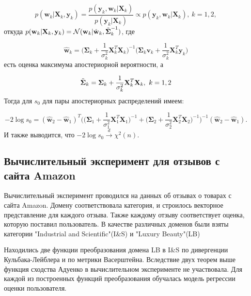 \documentclass[12pt]{extarticle}
\newcommand{\bfw}{\mathbf{w}}
\newcommand{\bfv}{\mathbf{v}}
\newcommand{\bfX}{\mathbf{X}}
\newcommand{\bfy}{\mathbf{y}}
\newcommand{\bsigma}{\boldsymbol\Sigma}
\begin{document}
$$p(\bfw_k|\bfX_k, \bfy_k) = \frac{p(\bfy_k, \bfw_k|\bfX_k)}{p(\bfy_k|\bfX_k)} \propto p(\bfy_k, \bfw_k|\bfX_k), \ k = 1, 2,$$
откуда $p(\bfw_k|\bfX_k, \bfy_k) = \mathcal{N} (\bfw_k|\hat{\bfw}_k, \Tilde{\bsigma}^{-1}_k)$, где

$$\hat{\bfw}_k = \Big( \bsigma_k + \frac{1}{\sigma^2_k} \bfX^T_k\bfX_k\Big)^{-1} \Big( \bsigma_k\bfv_k + \frac{1}{\sigma^2_k}\bfX^T_k\bfy_k\Big)$$
есть оценка максимума апостериорной вероятности, а

$$\Tilde{\bsigma}_k = \bsigma_k + \frac{1}{\sigma^2_k}\bfX^T_k\bfX_k, \ k = 1, 2$$
Тогда для $s_0$ для пары апостериорных распределений имеем:

$$- 2 \log s_0 = (\hat{\bfw}_2 - \hat{\bfw}_1)^T \Bigg( \Big( \bsigma_1 + \frac{1}{\sigma^2_1}\bfX^T_1\bfX_1 \Big)^{-1} + \Big( \bsigma_2 + \frac{1}{\sigma^2_2}\bfX^T_2\bfX_2 \Big)^{-1} \Bigg)^{-1} (\hat{\bfw}_2 - \hat{\bfw}_1).$$
И также выводится, что $-2 \log s_0 \xrightarrow{d} \chi^2(n)$.

\newpage
\subsection{Вычислительный эксперимент для отзывов с сайта Amazon}

Вычислительный эксперимент проводился на данных об отзывах о товарах с сайта Amazon. Домену соответствовала категория, и строилось векторное представление для каждого отзыва. Также каждому отзыву соответствует оценка, которую поставил пользователь. В качестве различных доменов были взяты категории "Industrial and Scientific"(I\&S) и "Luxury Beauty"(LB)

Находились две функции преобразования домена LB в I\&S по дивергенции Кульбака-Лейблера и по метрики Васерштейна. Вследствие двух теорем выше функция сходства Адуенко в вычислительном эксперименте не участвовала. Для каждой из построенных функций преобразования обучалась модель регрессии оценки пользователя.
\end{document}
